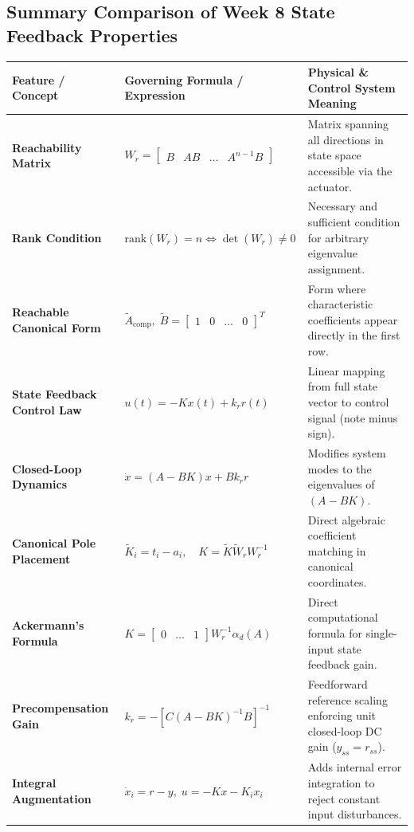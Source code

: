 \documentclass[12pt,onecolumn,twoside ]{article}
\begin{document}
	\subsection{Summary Comparison of Week 8 State Feedback Properties}
	\begin{center}\small\begin{tabularx}{\textwidth}{*{3}{Y}}
			\toprule
			\textbf{Feature / Concept} & \textbf{Governing Formula / Expression} & \textbf{Physical \& Control System Meaning} \\
			\midrule
			\textbf{Reachability Matrix} & $W_r = \begin{bmatrix} B & AB & \dots & A^{n-1}B \end{bmatrix}$ & Matrix spanning all directions in state space accessible via the actuator. \\
			\textbf{Rank Condition} & $\text{rank}(W_r) = n \iff \det(W_r) \neq 0$ & Necessary and sufficient condition for arbitrary eigenvalue assignment. \\
			\textbf{Reachable Canonical Form} & $\tilde{A}_{\text{comp}},\; \tilde{B} = \begin{bmatrix} 1 & 0 & \dots & 0 \end{bmatrix}^T$ & Form where characteristic coefficients appear directly in the first row. \\
			\textbf{State Feedback Control Law} & $u(t) = -Kx(t) + k_r r(t)$ & Linear mapping from full state vector to control signal (note minus sign). \\
			\textbf{Closed-Loop Dynamics} & $\dot{x} = (A - BK)x + B k_r r$ & Modifies system modes to the eigenvalues of $(A - BK)$. \\
			\textbf{Canonical Pole Placement} & $\tilde{K}_i = t_i - a_i, \quad K = \tilde{K}\tilde{W}_r W_r^{-1}$ & Direct algebraic coefficient matching in canonical coordinates. \\
			\textbf{Ackermann’s Formula} & $K = \begin{bmatrix} 0 & \dots & 1 \end{bmatrix} W_r^{-1} \alpha_d(A)$ & Direct computational formula for single-input state feedback gain. \\
			\textbf{Precompensation Gain} & $k_r = -[C(A - BK)^{-1}B]^{-1}$ & Feedforward reference scaling enforcing unit closed-loop DC gain ($y_{ss} = r_{ss}$). \\
			\textbf{Integral Augmentation} & $\dot{x}_i = r - y,\; u = -Kx - K_i x_i$ & Adds internal error integration to reject constant input disturbances. \\
			\bottomrule
	\end{tabularx}\end{center}
	
\end{document}
